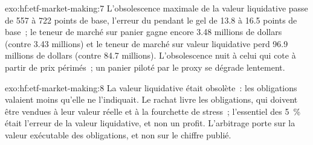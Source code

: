 \begin{solution}{exo:hf:etf-market-making:7}
L'obsolescence maximale de la valeur liquidative passe de 557 à 722 points de base, l'erreur du  pendant le gel de 13.8 à 16.5 points de base~;
le teneur de marché sur panier gagne encore 3.48 millions de dollars (contre 3.43 millions) et le teneur de marché sur valeur liquidative perd 96.9 millions de dollars (contre 84.7 millions).
L'obsolescence nuit à celui qui cote à partir de prix périmés~; un panier piloté par le proxy se dégrade lentement.
\end{solution}

\begin{solution}{exo:hf:etf-market-making:8}
La valeur liquidative était obsolète~: les obligations valaient moins qu'elle ne l'indiquait. Le rachat livre les obligations, qui doivent être vendues
à leur valeur réelle et à la fourchette de stress~; l'essentiel des 5~\% était l'erreur de la valeur liquidative, et non un profit.
L'arbitrage porte sur la valeur exécutable des obligations, et non sur le chiffre publié.
\end{solution}

